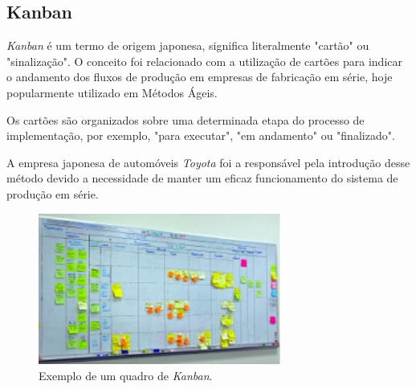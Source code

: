 \subsection{Kanban}
\par \emph{Kanban} é um termo de origem japonesa, significa literalmente "cartão" ou "sinalização". O conceito foi relacionado com a utilização de cartões para indicar o andamento dos fluxos de produção em empresas de fabricação em série, hoje popularmente utilizado em Métodos Ágeis. 
\par Os cartões são organizados sobre uma determinada etapa do processo de implementação, por exemplo, "para executar", "em andamento" ou "finalizado".
\par A empresa japonesa de automóveis \emph{Toyota} foi a responsável pela introdução desse método devido a necessidade de manter um eficaz funcionamento do sistema de produção em série.
\begin{figure}[!htb]
\centering
\includegraphics[width=8cm]{figuras/kanban_exemplo}
\caption{\label{fig:kanban_exemplo}Exemplo de um quadro de \emph{Kanban}.}
\end{figure}

